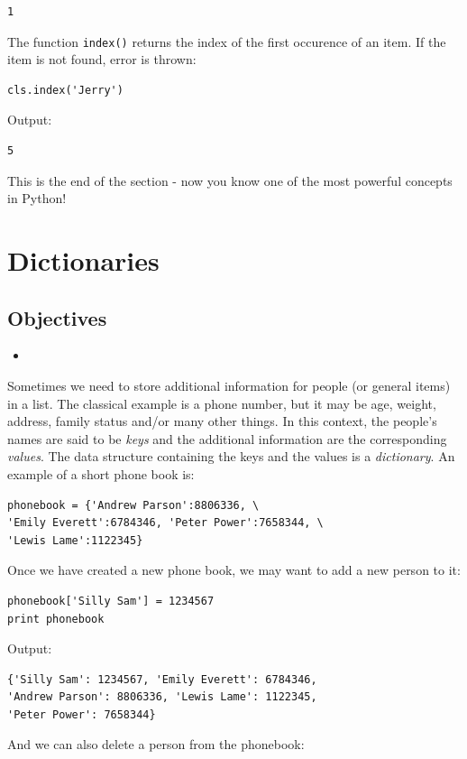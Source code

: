 \documentclass[article,A4,12pt]{llncs}
\begin{document}
\begin{verbatim}
1
\end{verbatim}
The function {\tt index()} returns the index of the first occurence 
of an item. If the item is not found, error is thrown:

\begin{verbatim}
cls.index('Jerry')
\end{verbatim}
Output:

\begin{verbatim}
5
\end{verbatim}
This is the end of the section - now you know one of the most powerful 
concepts in Python!

\section{Dictionaries}

\subsection{Objectives}

\begin{itemize}
\item
\end{itemize}

Sometimes we need to store additional information for 
people (or general items) in a list. The classical example is 
a phone number, but it may be age, weight, address, family 
status and/or many other things. In this context, the 
people's names are said to be {\em keys} and the additional 
information are the corresponding {\em values}. The data structure
containing the keys and the values is a {\em dictionary}. An
example of a short phone book is:

\begin{verbatim}
phonebook = {'Andrew Parson':8806336, \
'Emily Everett':6784346, 'Peter Power':7658344, \
'Lewis Lame':1122345}
\end{verbatim}
Once we have created a new phone book, we may want to add a new person to it:

\begin{verbatim}
phonebook['Silly Sam'] = 1234567
print phonebook
\end{verbatim}
Output:

\begin{verbatim}
{'Silly Sam': 1234567, 'Emily Everett': 6784346, 
'Andrew Parson': 8806336, 'Lewis Lame': 1122345, 
'Peter Power': 7658344}
\end{verbatim}
And we can also delete a person from the phonebook:
\end{document}
